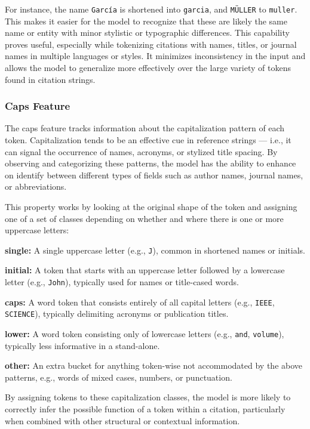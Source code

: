 For instance, the name \texttt{García} is shortened into \texttt{garcia}, and \texttt{MÜLLER} to \texttt{muller}. This makes it easier for the model to recognize that these are likely the same name or entity with minor stylistic or typographic differences.
This capability proves useful, especially while tokenizing citations with names, titles, or journal names in multiple languages or styles. It minimizes inconsistency in the input and allows the model to generalize more effectively over the large variety of tokens found in citation strings.

\subsubsection{Caps Feature}
The caps feature tracks information about the capitalization pattern of each token. Capitalization tends to be an effective cue in reference strings — i.e., it can signal the occurrence of names, acronyms, or stylized title spacing. By observing and categorizing these patterns, the model has the ability to enhance on identify between different types of fields such as author names, journal names, or abbreviations.

This property works by looking at the original shape of the token and assigning one of a set of classes depending on whether and where there is one or more uppercase letters:
\begin{compactitem}
\item \textbf{single:} A single uppercase letter (e.g., \texttt{J}), common in shortened names or initials.
\item \textbf{initial:} A token that starts with an uppercase letter followed by a lowercase letter (e.g., \texttt{John}), typically used for names or title-cased words.
\item \textbf{caps:} A word token that consists entirely of all capital letters (e.g., \texttt{IEEE}, \texttt{SCIENCE}), typically delimiting acronyms or publication titles.
\item \textbf{lower:} A word token consisting only of lowercase letters (e.g., \texttt{and}, \texttt{volume}), typically less informative in a stand-alone.
\item \textbf{other:} An extra bucket for anything token-wise not accommodated by the above patterns, e.g., words of mixed cases, numbers, or punctuation.
\end{compactitem}

By assigning tokens to these capitalization classes, the model is more likely to correctly infer the possible function of a token within a citation, particularly when combined with other structural or contextual information.

